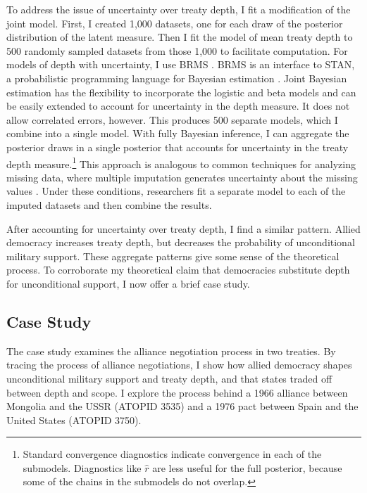 \documentclass[12pt]{article}
\begin{document}
To address the issue of uncertainty over treaty depth, I fit a modification of the joint model. 
First, I created 1,000 datasets, one for each draw of the posterior distribution of the latent measure.
Then I fit the model of mean treaty depth to 500 randomly sampled datasets from those 1,000 to facilitate computation. 
For models of depth with uncertainty, I use BRMS \citep{Buerkner2017}. 
BRMS is an interface to STAN, a probabilistic programming language for Bayesian estimation \citep{Carpenteretal2016}. 
Joint Bayesian estimation has the flexibility to incorporate the logistic and beta models and can be easily extended to account for uncertainty in the depth measure. 
It does not allow correlated errors, however.
This produces 500 separate models, which I combine into a single model. 
With fully Bayesian inference, I can aggregate the posterior draws in a single posterior that accounts for uncertainty in the treaty depth measure.\footnote{Standard convergence diagnostics indicate convergence in each of the submodels. Diagnostics like $\hat{r}$ are less useful for the full posterior, because some of the chains in the submodels do not overlap.}
This approach is analogous to common techniques for analyzing missing data, where multiple imputation generates uncertainty about the missing values \citep{Hollenbachetal2018imp}.
Under these conditions, researchers fit a separate model to each of the imputed datasets and then combine the results. 


After accounting for uncertainty over treaty depth, I find a similar pattern. 
Allied democracy increases treaty depth, but decreases the probability of unconditional military support. 
These aggregate patterns give some sense of the theoretical process. 
To corroborate my theoretical claim that democracies substitute depth for unconditional support, I now offer a brief case study. 


\subsection{Case Study}


The case study examines the alliance negotiation process in two treaties. 
By tracing the process of alliance negotiations, I show how allied democracy shapes unconditional military support and treaty depth, and that states traded off between depth and scope. 
I explore the process behind a 1966 alliance between Mongolia and the USSR (ATOPID 3535) and a 1976 pact between Spain and the United States (ATOPID 3750). 
\end{document}
